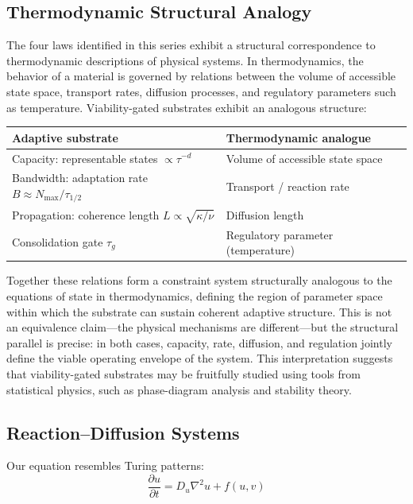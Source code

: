 \documentclass[11pt]{article}
\begin{document}
\subsection{Thermodynamic Structural Analogy}
\label{sec:thermo}

The four laws identified in this series exhibit a structural correspondence to thermodynamic descriptions of physical systems.
In thermodynamics, the behavior of a material is governed by relations between the volume of accessible state space, transport rates, diffusion processes, and regulatory parameters such as temperature.
Viability-gated substrates exhibit an analogous structure:

\begin{center}
\begin{tabular}{ll}
\toprule
\textbf{Adaptive substrate} & \textbf{Thermodynamic analogue} \\
\midrule
Capacity: representable states $\propto \tau^{-d}$ & Volume of accessible state space \\
Bandwidth: adaptation rate $B \approx N_{\max}/\tau_{1/2}$ & Transport / reaction rate \\
Propagation: coherence length $L \propto \sqrt{\kappa/\nu}$ & Diffusion length \\
Consolidation gate $\tau_g$ & Regulatory parameter (temperature) \\
\bottomrule
\end{tabular}
\end{center}

Together these relations form a constraint system structurally analogous to the equations of state in thermodynamics, defining the region of parameter space within which the substrate can sustain coherent adaptive structure.
This is not an equivalence claim---the physical mechanisms are different---but the structural parallel is precise: in both cases, capacity, rate, diffusion, and regulation jointly define the viable operating envelope of the system.
This interpretation suggests that viability-gated substrates may be fruitfully studied using tools from statistical physics, such as phase-diagram analysis and stability theory.

\subsection{Reaction--Diffusion Systems}

Our equation resembles Turing patterns:
\begin{equation}
\frac{\partial u}{\partial t} = D_u \nabla^2 u + f(u, v)
\end{equation}
\end{document}
